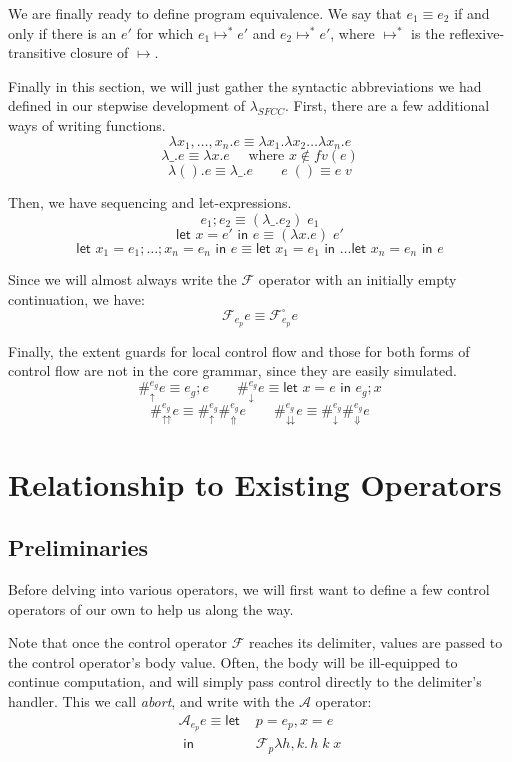 \documentclass[11pt]{article}
\newcommand{\maybePage}{\null}
\newcommand\x{\lambda x}
\newcommand{\letin}[2]{\textsf{let }#1\textsf{ in }#2}
\newcommand\F{\mathcal{F}}
\newcommand\A{\mathcal{A}}
\begin{document}
We are finally ready to define program equivalence.
We say that $e_1 \equiv e_2$ if and only if there is an $e'$ for which $e_1 \mapsto^* e'$ and $e_2 \mapsto^* e'$, where $\mapsto^*$ is the reflexive-transitive closure of $\mapsto$.

Finally in this section, we will just gather the syntactic abbreviations we had defined in our stepwise development of $\lambda_{SFCC}$.
First, there are a few additional ways of writing functions.
$$\x_1,\ldots,x_n.e \equiv \x_1.\x_2\ldots\x_n.e$$
$$\lambda\_.e \equiv \x.e \quad\textrm{ where }x \notin fv(e)$$
$$\lambda().e \equiv \lambda\_.e \qquad
  e\;() \equiv e\;v$$

\newpage %
Then, we have sequencing and let-expressions.
$$e_1; e_2 \equiv (\lambda\_.e_2)\;e_1$$
$$\letin{x = e'}{e} \equiv (\x.e)\;e'$$
$$\letin{x_1 = e_1; \ldots; x_n = e_n}{e} \equiv \letin{x_1 = e_1}{\ldots\letin{x_n = e_n}{e}}$$

Since we will almost always write the $\F$ operator with an initially empty continuation, we have:
$$\F_{e_p}e \equiv \F_{e_p}^{\square}e$$

Finally, the extent guards for local control flow and those for both forms of control flow are not in the core grammar, since they are easily simulated.
$$\#_\uparrow^{e_g}e \equiv e_g; e \qquad
  \#_\downarrow^{e_g}e \equiv \letin{x=e}{e_g; x}$$
$$\#_\upuparrows^{e_g}e \equiv \#_\uparrow^{e_g}\#_\Uparrow^{e_g}e \qquad
  \#_\downdownarrows^{e_g}e \equiv \#_\downarrow^{e_g}\#_\Downarrow^{e_g}e$$





\maybePage
\section{Relationship to Existing Operators}
\label{sec:relationship}

\subsection{Preliminaries}
Before delving into various operators, we will first want to define a few control operators of our own to help us along the way.

Note that once the control operator $\F$ reaches its delimiter, values are passed to the control operator's body value.
Often, the body will be ill-equipped to continue computation, and will simply pass control directly to the delimiter's handler.
This we call \emph{abort}, and write with the $\A$ operator:
\begin{align*}
\A_{e_p}e \equiv \letin{&p = e_p, x = e\\}%
                       {&\F_{p}\lambda h,k.\,h\;k\;x}
\end{align*}
\end{document}

